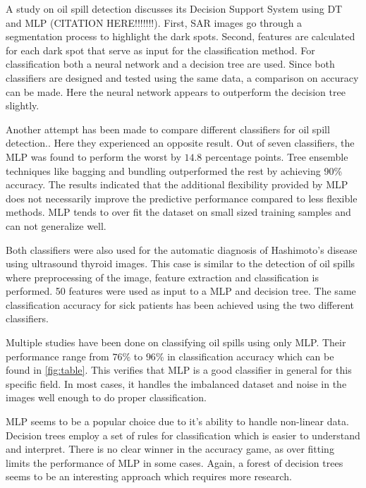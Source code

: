 A study on oil spill detection discusses its Decision Support System using DT and MLP (CITATION HERE!!!!!!!). First, SAR images go through a segmentation process to highlight the dark spots. Second, features are calculated for each dark spot that serve as input for the classification method. For classification both a neural network and a decision tree are used. Since both classifiers are designed and tested using the same data, a comparison on accuracy can be made. Here the neural network appears to outperform the decision tree slightly.
	
Another attempt has been made to compare different classifiers for oil spill detection.\cite{Xu201414}. Here they experienced an opposite result. Out of seven classifiers, the MLP was found to perform the worst by $14.8$ percentage points. Tree ensemble techniques like bagging and bundling outperformed the rest by achieving 90\% accuracy. The results indicated that the additional flexibility provided by MLP does not necessarily improve the predictive performance compared to less flexible methods. MLP tends to over fit the dataset on small sized training samples and can not generalize well. 
	
Both classifiers were also used for the automatic diagnosis of Hashimoto's disease using ultrasound thyroid images\cite{Omiotek201340}. This case is similar to the detection of oil spills where preprocessing of the image, feature extraction and classification is performed. 50 features were used as input to a MLP and decision tree. The same classification accuracy for sick patients has been achieved using the two different classifiers.

Multiple studies \cite{Topouzelis200762, Delfrate200038, Topouzelis200930, Topouzelis200924, Delfrate2004} have been done on classifying oil spills using only MLP. Their performance range from $76$\% to $96$\% in classification accuracy which can be found in \ref{fig:table}. This verifies that MLP is a good classifier in general for this specific field. In most cases, it handles the imbalanced dataset and noise in the images well enough to do proper classification.

MLP seems to be a popular choice due to it's ability to handle non-linear data. Decision trees employ a set of rules for classification which is easier to understand and interpret. There is no clear winner in the accuracy game, as over fitting limits the performance of MLP in some cases. Again, a forest of decision trees seems to be an interesting approach which requires more research.






	